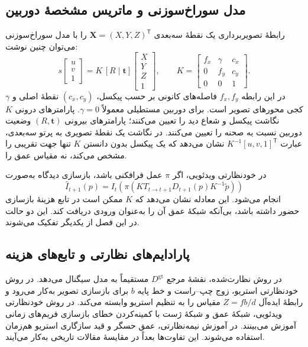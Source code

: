 \subsection{مدل سوراخ‌سوزنی و ماتریس مشخصهٔ دوربین}
رابطهٔ تصویربرداری یک نقطهٔ سه‌بعدی $\mathbf X=(X,Y,Z)^\mathsf T$ را با مدل سوراخ‌سوزنی می‌توان چنین نوشت:
\begin{equation}
 s\begin{bmatrix}u\\v\\1\end{bmatrix}=K\,[R\mid\mathbf t]
 \begin{bmatrix}X\\Y\\Z\\1\end{bmatrix},\qquad
 K=\begin{bmatrix}f_x&\gamma&c_x\\0&f_y&c_y\\0&0&1\end{bmatrix}.
\end{equation}
در این رابطه $f_x,f_y$ فاصله‌های کانونی بر حسب پیکسل، $(c_x,c_y)$ نقطهٔ اصلی و $\gamma$ کجی محورهای تصویر است. برای دوربین مستطیلی معمولاً $\gamma=0$. پارامترهای درونی $K$ نگاشت پیکسل و شعاع دید را تعیین می‌کنند؛ پارامترهای بیرونی $(R,\mathbf t)$ وضعیت دوربین نسبت به صحنه را تعیین می‌کنند. در نگاشت یک نقطهٔ تصویری به پرتو سه‌بعدی، عبارت $K^{-1}[u,v,1]^\mathsf T$ نشان می‌دهد که یک پیکسل بدون دانستن $K$ تنها جهت تقریبی را مشخص می‌کند، نه مقیاس عمق را.

در خودنظارتی ویدئویی، اگر $\pi$ عمل فرافکنی باشد، بازسازی دیدگاه به‌صورت
\begin{equation}
 \hat I_{t+1}(p)=I_t\left(\pi\left(KT_{t\rightarrow t+1}D_{t+1}(p)K^{-1}\tilde p\right)\right)
\end{equation}
انجام می‌شود. این معادله نشان می‌دهد که $K$ ممکن است در تابع هزینهٔ بازسازی حضور داشته باشد، بی‌آنکه شبکهٔ عمق آن را به‌عنوان ورودی دریافت کند. این دو حالت در این فصل از یکدیگر تفکیک می‌شوند.

\subsection{پارادایم‌های نظارتی و تابع‌های هزینه}
در روش نظارت‌شده، نقشهٔ مرجع $D^{\mathrm{gt}}$ مستقیماً به مدل سیگنال می‌دهد. در روش خودنظارتی استریو، زوج چپ--راست و خط پایه $b$ برای بازسازی تصویر به‌کار می‌رود و رابطهٔ ایده‌آل $Z=fb/d$ مقیاس را به تنظیم استریو وابسته می‌کند. در روش خودنظارتی ویدئویی، شبکهٔ عمق و شبکهٔ ژست با کمینه‌کردن خطای بازسازی فریم‌های زمانی آموزش می‌بینند. در آموزش نیمه‌نظارتی، عمق حسگر و قید سازگاری استریو هم‌زمان استفاده می‌شوند. این تفاوت‌ها بعداً در مقایسهٔ مقالات تاریخی به‌کار می‌آیند.

